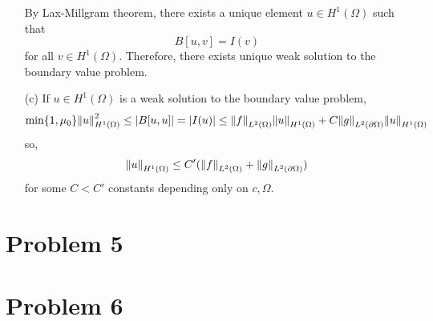 \documentclass{article}
\begin{document}
\begin{enumerate}
By Lax-Millgram theorem, there exists a unique element $u\in H^1(\Omega)$ such that
\begin{equation*}
B[u,v]=I(v)
\end{equation*}
for all $v\in H^1(\Omega)$. Therefore, there exists unique weak solution to the boundary value problem.
\item[(c)] If $u\in H^1(\Omega)$ is a weak solution to the boundary value problem,
\begin{equation*}
\min\{1,\mu_0\}\norm{u}^2_{H^1(\Omega)}\leq \abs{B[u,u]}=\abs{I(u)}\leq \norm{f}_{L^2(\Omega)}\norm{u}_{H^1(\Omega)}+C\norm{g}_{L^2(\partial \Omega)}\norm{u}_{H^1(\Omega)}
\end{equation*}
so,
\begin{equation*}
\norm{u}_{H^1(\Omega)}\leq C'(\norm{f}_{L^2(\Omega)}+\norm{g}_{L^2(\partial \Omega)})
\end{equation*}
for some $C<C'$ constants depending only on $c,\Omega$.
\end{enumerate}
\section*{Problem 5}

\section*{Problem 6}
\end{document}
